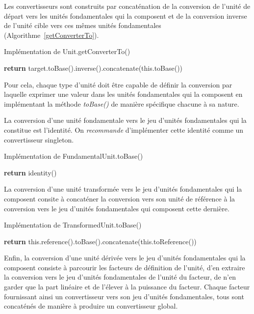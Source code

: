 \documentclass[a4paper,twoside,10pt]{article}
\begin{document}
Les convertisseurs sont construits par concaténation de la conversion de l'unité de départ vers les unités fondamentales
qui la composent et de la conversion inverse de l'unité cible vers ces mêmes unités fondamentales
(Algorithme~\ref{getConverterTo}).

\begin{algorithm}[!h]
\caption{Implémentation de Unit.getConverterTo()}\label{getConverterTo}
\begin{algorithmic}
\State \textbf{return} target.toBase().inverse().concatenate(this.toBase())
\EndProcedure
\end{algorithmic}
\end{algorithm}

Pour cela, chaque type d'unité doit être capable de définir la conversion par laquelle exprimer une valeur dans les
unités fondamentales qui la composent en implémentant la méthode \emph{toBase()} de manière spécifique chacune à sa
nature.

La conversion d'une unité fondamentale vers le jeu d'unités fondamentales qui la constitue est l'identité. On
\emph{recommande} d'implémenter cette identité comme un convertisseur singleton.

\begin{algorithm}[!h]
\caption{Implémentation de FundamentalUnit.toBase()}\label{fundamentalToBase}
\begin{algorithmic}
\State \textbf{return} identity()
\EndProcedure
\end{algorithmic}
\end{algorithm}

La conversion d'une unité transformée vers le jeu d'unités fondamentales qui la composent consite à concaténer la
conversion vers son unité de référence à la conversion vers le jeu d'unités fondamentales qui composent cette dernière.

\begin{algorithm}[!h]
\caption{Implémentation de TransformedUnit.toBase()}\label{transformedToBase}
\begin{algorithmic}
\State \textbf{return} this.reference().toBase().concatenate(this.toReference())
\EndProcedure
\end{algorithmic}
\end{algorithm}

Enfin, la conversion d'une unité dérivée vers le jeu d'unités fondamentales qui la composent consiste à parcourir les
facteurs de définition de l'unité, d'en extraire la conversion vers le jeu d'unités fondamentales de l'unité du facteur,
de n'en garder que la part linéaire et de l'élever à la puissance du facteur. Chaque facteur fournissant ainsi un
convertisseur vers son jeu d'unités fondamentales, tous sont concaténés de manière à produire un convertisseur global.
\end{document}
